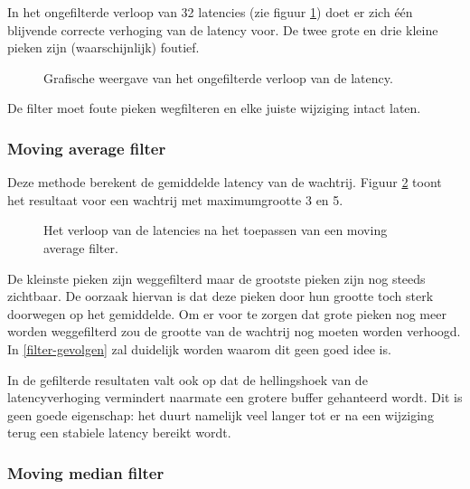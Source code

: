 In het ongefilterde verloop van 32 latencies (zie figuur \ref{latencydata}) doet er zich één blijvende correcte verhoging van de latency voor. De twee grote en drie kleine pieken zijn (waarschijnlijk) foutief.



\begin{figure}[h!]
	\captionsetup{width=0.7\textwidth}
	\caption[Het ongefilterde verloop van de latency]{Grafische weergave van het ongefilterde verloop van de latency.}
	\begin{center}
		\advance\parskip0.3cm
	\end{center}
	\label{latencydata}
\end{figure}

De filter moet foute pieken wegfilteren en elke juiste wijziging intact laten.

\subsubsection{Moving average filter}

Deze methode berekent de gemiddelde latency van de wachtrij. Figuur \ref{average-graphs} toont het resultaat voor een wachtrij met maximumgrootte 3 en 5.

\begin{figure}[!tbph]
	\centering
	\hfill
	\captionsetup{width=0.7\textwidth}
	\caption{Het verloop van de latencies na het toepassen van een moving average filter.}
	\label{average-graphs}
\end{figure}

De kleinste pieken zijn weggefilterd maar de grootste pieken zijn nog steeds zichtbaar. De oorzaak hiervan is dat deze pieken door hun grootte toch sterk doorwegen op het gemiddelde. Om er voor te zorgen dat grote pieken nog meer worden weggefilterd zou de grootte van de wachtrij nog moeten worden verhoogd. In \ref{filter-gevolgen} zal duidelijk worden waarom dit geen goed idee is.

In de gefilterde resultaten valt ook op dat de hellingshoek van de latencyverhoging vermindert naarmate een grotere buffer gehanteerd wordt. Dit is geen goede eigenschap: het duurt namelijk veel langer tot er na een wijziging terug een stabiele latency bereikt wordt.

\subsubsection{Moving median filter}

